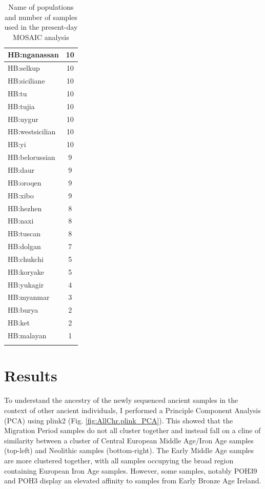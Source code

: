\begin{table}
\begin{tabular}{l|c}
\hline
HB:nganassan & 10\\
\hline
HB:selkup & 10\\
\hline
HB:siciliane & 10\\
\hline
HB:tu & 10\\
\hline
HB:tujia & 10\\
\hline
HB:uygur & 10\\
\hline
HB:westsicilian & 10\\
\hline
HB:yi & 10\\
\hline
HB:belorussian & 9\\
\hline
HB:daur & 9\\
\hline
HB:oroqen & 9\\
\hline
HB:xibo & 9\\
\hline
HB:hezhen & 8\\
\hline
HB:naxi & 8\\
\hline
HB:tuscan & 8\\
\hline
HB:dolgan & 7\\
\hline
HB:chukchi & 5\\
\hline
HB:koryake & 5\\
\hline
HB:yukagir & 4\\
\hline
HB:myanmar & 3\\
\hline
HB:burya & 2\\
\hline
HB:ket & 2\\
\hline
HB:malayan & 1\\
\hline
\label{table:present-day_inds_MOSAIC}
\end{tabular}
\caption{Name of populations and number of samples used in the present-day MOSAIC analysis}
\end{table}

\section{Results}

To understand the ancestry of the newly sequenced ancient samples in the context of other ancient individuals, I performed a Principle Component Analysis (PCA) using plink2 (Fig. \ref{fig:AllChr.plink_PCA}). This showed that the Migration Period samples do not all cluster together and instead fall on a cline of similarity between a cluster of Central European Middle Age/Iron Age samples (top-left) and Neolithic samples (bottom-right). The Early Middle Age samples are more clustered together, with all samples occupying the broad region containing European Iron Age samples. However, some samples, notably POH39 and POH3 display an elevated affinity to samples from Early Bronze Age Ireland. 

